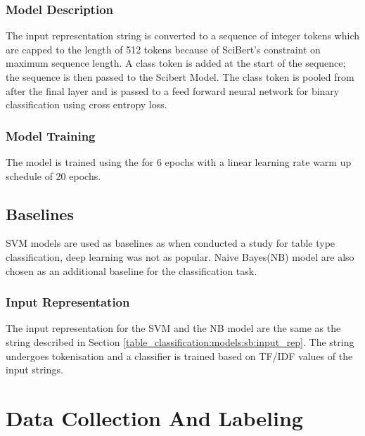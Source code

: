 \subsubsection{Model Description}
The input representation string is converted to a sequence of integer tokens which are capped to the length of 512 tokens because of SciBert's constraint on maximum sequence length. A class token is added at the start of the sequence; the sequence is then passed to the Scibert Model. The class token is pooled from after the final layer and is passed to a feed forward neural network for binary classification using cross entropy loss. 

\subsubsection{Model Training}
The model is trained using the for 6 epochs with a linear learning rate warm up schedule of 20 epochs.

\subsection{Baselines}
SVM models are used as baselines as when \cite{kim2012scientific} conducted a study for table type classification, deep learning was not as popular. Naive Bayes(NB) model are also chosen as an additional baseline for the classification task. 

\subsubsection{Input Representation}
The input representation for the SVM and the NB model are the same as the string described in Section \ref{table_classification:models:sb:input_rep}. The string undergoes tokenisation and a classifier is trained based on TF/IDF values of the input strings. 


\section{Data Collection And Labeling}
\label{table_classification:data-coll}

